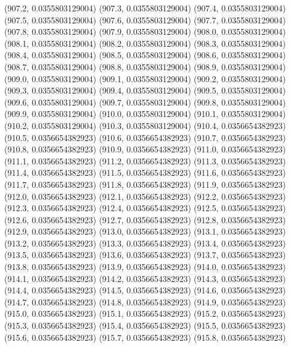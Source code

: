 {					(907.2, 0.0355803129004)
					(907.3, 0.0355803129004)
					(907.4, 0.0355803129004)
					(907.5, 0.0355803129004)
					(907.6, 0.0355803129004)
					(907.7, 0.0355803129004)
					(907.8, 0.0355803129004)
					(907.9, 0.0355803129004)
					(908.0, 0.0355803129004)
					(908.1, 0.0355803129004)
					(908.2, 0.0355803129004)
					(908.3, 0.0355803129004)
					(908.4, 0.0355803129004)
					(908.5, 0.0355803129004)
					(908.6, 0.0355803129004)
					(908.7, 0.0355803129004)
					(908.8, 0.0355803129004)
					(908.9, 0.0355803129004)
					(909.0, 0.0355803129004)
					(909.1, 0.0355803129004)
					(909.2, 0.0355803129004)
					(909.3, 0.0355803129004)
					(909.4, 0.0355803129004)
					(909.5, 0.0355803129004)
					(909.6, 0.0355803129004)
					(909.7, 0.0355803129004)
					(909.8, 0.0355803129004)
					(909.9, 0.0355803129004)
					(910.0, 0.0355803129004)
					(910.1, 0.0355803129004)
					(910.2, 0.0355803129004)
					(910.3, 0.0355803129004)
					(910.4, 0.0356654382923)
					(910.5, 0.0356654382923)
					(910.6, 0.0356654382923)
					(910.7, 0.0356654382923)
					(910.8, 0.0356654382923)
					(910.9, 0.0356654382923)
					(911.0, 0.0356654382923)
					(911.1, 0.0356654382923)
					(911.2, 0.0356654382923)
					(911.3, 0.0356654382923)
					(911.4, 0.0356654382923)
					(911.5, 0.0356654382923)
					(911.6, 0.0356654382923)
					(911.7, 0.0356654382923)
					(911.8, 0.0356654382923)
					(911.9, 0.0356654382923)
					(912.0, 0.0356654382923)
					(912.1, 0.0356654382923)
					(912.2, 0.0356654382923)
					(912.3, 0.0356654382923)
					(912.4, 0.0356654382923)
					(912.5, 0.0356654382923)
					(912.6, 0.0356654382923)
					(912.7, 0.0356654382923)
					(912.8, 0.0356654382923)
					(912.9, 0.0356654382923)
					(913.0, 0.0356654382923)
					(913.1, 0.0356654382923)
					(913.2, 0.0356654382923)
					(913.3, 0.0356654382923)
					(913.4, 0.0356654382923)
					(913.5, 0.0356654382923)
					(913.6, 0.0356654382923)
					(913.7, 0.0356654382923)
					(913.8, 0.0356654382923)
					(913.9, 0.0356654382923)
					(914.0, 0.0356654382923)
					(914.1, 0.0356654382923)
					(914.2, 0.0356654382923)
					(914.3, 0.0356654382923)
					(914.4, 0.0356654382923)
					(914.5, 0.0356654382923)
					(914.6, 0.0356654382923)
					(914.7, 0.0356654382923)
					(914.8, 0.0356654382923)
					(914.9, 0.0356654382923)
					(915.0, 0.0356654382923)
					(915.1, 0.0356654382923)
					(915.2, 0.0356654382923)
					(915.3, 0.0356654382923)
					(915.4, 0.0356654382923)
					(915.5, 0.0356654382923)
					(915.6, 0.0356654382923)
					(915.7, 0.0356654382923)
					(915.8, 0.0356654382923)
}
